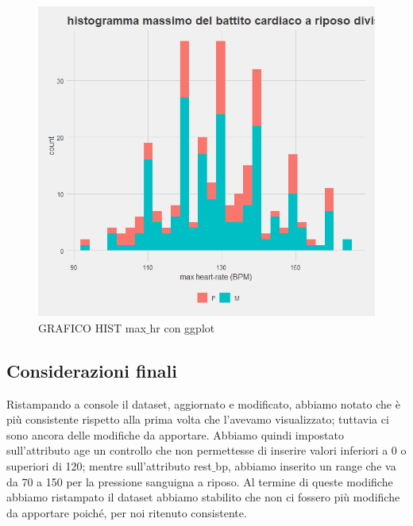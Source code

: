 \documentclass{article}
\begin{document}
\begin{figure}[!htb]
\begin{minipage}{0.475\textwidth}
     \includegraphics[width=1\linewidth]{rest_bp-hist after}
     \caption{GRAFICO HIST max$\_$hr con ggplot}
     \label{Fig:ds1}
   \end{minipage}
\end{figure}

\subsection { Considerazioni finali }
Ristampando a console il dataset, aggiornato e modificato, abbiamo notato che è più consistente rispetto alla prima volta che l’avevamo visualizzato; tuttavia ci sono ancora delle modifiche da apportare. Abbiamo quindi impostato sull’attributo age un controllo che non permettesse di inserire valori inferiori a 0 o superiori di 120; mentre sull’attributo rest$\_$bp, abbiamo inserito un range che va da 70 a 150 per la pressione sanguigna a riposo. Al termine di queste modifiche abbiamo ristampato il dataset abbiamo stabilito che non ci fossero più modifiche da apportare poiché, per noi ritenuto consistente. 
\end{document}
